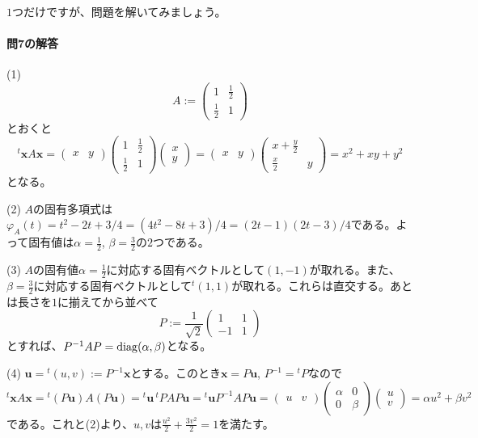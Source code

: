 $1$つだけですが、問題を解いてみましょう。

\paragraph{問7の解答}
(1)
\[
A :=
\begin{pmatrix}
1 & \frac{1}{2} \\
\frac{1}{2} & 1
\end{pmatrix}
\]
とおくと
\[
{}^t\bm{x} A \bm{x}
=
\begin{pmatrix}
x & y
\end{pmatrix}
\begin{pmatrix}
1 & \frac{1}{2} \\
\frac{1}{2} & 1
\end{pmatrix}
\begin{pmatrix}
x \\
y
\end{pmatrix}
=
\begin{pmatrix}
x & y
\end{pmatrix}
\begin{pmatrix}
x + \frac{y}{2} \\
\frac{x}{2} & y
\end{pmatrix}
= x^2 + xy + y^2
\]
となる。

\noindent (2) $A$の固有多項式は$\varphi_A(t) = t^2 - 2t + 3/4 = (4t^2 - 8t + 3)/4 = (2t - 1)(2t - 3)/4$である。よって固有値は$\alpha = \frac{1}{2}$, $\beta = \frac{3}{2}$の$2$つである。

\noindent (3) $A$の固有値$\alpha = \frac{1}{2}$に対応する固有ベクトルとして$(1, -1)$が取れる。また、$\beta = \frac{3}{2}$に対応する固有ベクトルとして${}^t(1, 1)$が取れる。これらは直交する。あとは長さを$1$に揃えてから並べて
\[
P :=
\frac{1}{\sqrt{2}}
\begin{pmatrix}
1 & 1 \\
-1 & 1
\end{pmatrix}
\]
とすれば、$P^{-1} A P = \operatorname{diag}(\alpha, \beta)$となる。

\noindent (4) $\bm{u} = {}^t(u, v) := P^{-1}\bm{x}$とする。このとき$\bm{x} = P\bm{u}$, $P^{-1} = {}^tP$なので
\[
{}^t\bm{x} A \bm{x} = {}^t(P\bm{u}) A (P\bm{u}) = {}^t\bm{u}\, {}^tP A P \bm{u} = {}^t\bm{u} P^{-1} A P \bm{u} = 
\begin{pmatrix}
u & v
\end{pmatrix}
\begin{pmatrix}
\alpha & 0 \\
0 & \beta
\end{pmatrix}
\begin{pmatrix}
u \\
v
\end{pmatrix}
= \alpha u^2 + \beta v^2
\]
である。これと(2)より、$u, v$は$\frac{u^2}{2} + \frac{3 v^2}{2} = 1$を満たす。

